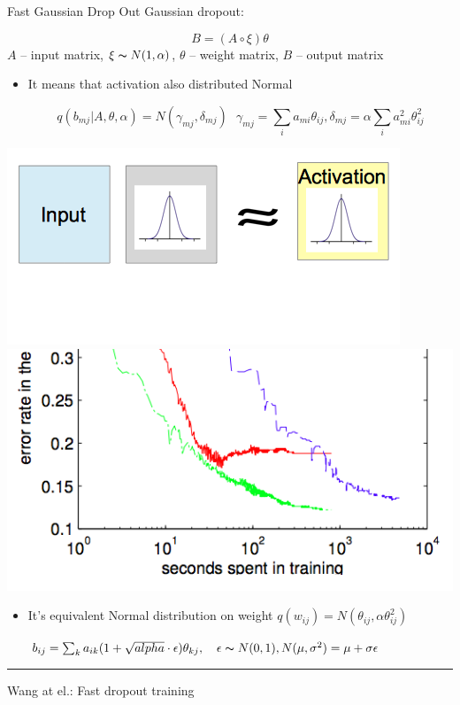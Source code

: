 \documentclass{beamer}
\begin{document}
\begin{frame}{Fast Gaussian  Drop Out}  
	Gaussian dropout:
	\vspace{-1.5cm}
	\begin{center}
		 $$B = (A \circ \xi) \theta$$
		$A$ -- input matrix, $\xi \thicksim N(1, \alpha)$, $\theta$ -- weight matrix, $B$ -- output matrix
	\end{center}
	
	\begin{itemize}
		\item It means that activation also distributed Normal
		
		$$q(b_{mj} | A, \theta, \alpha) = N(\gamma_{mj}, \delta_{mj})~~~\gamma_{mj} = \sum_i a_{mi}\theta_{ij}, \delta_{mj} = \alpha \sum_i a_{mi}^2\theta_{ij}^2$$
	\end{itemize}
	
	\begin{center}
		\includegraphics[scale=0.4]{img/act}
		\includegraphics[scale=0.3]{img/fast}
	\end{center}
	
	\vspace{-0.6cm}
		
		\begin{itemize}
			\item It's equivalent Normal distribution on weight $q(w_{ij}) = N(\theta_{ij}, \alpha\theta_{ij}^2)$
			
			\begin{center}
				$b_{ij} =  \sum_k a_{ik}(1+\sqrt{alpha}\cdot\epsilon)\theta_{kj},~~~\epsilon \thicksim N(0, 1),  N(\mu, \sigma^2) = \mu + \sigma\epsilon$
			\end{center}
		\end{itemize}
		
	\vspace{-0.2cm}
	
	\noindent\rule{12cm}{0.4pt}
	\footnotesize{ Wang at el.: Fast dropout training}
\end{frame}
\end{document}
